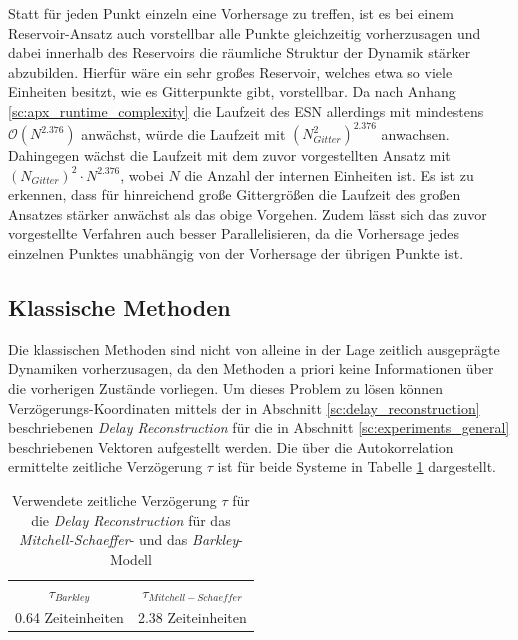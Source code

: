 Statt für jeden Punkt einzeln eine Vorhersage zu treffen, ist es bei einem Reservoir-Ansatz auch vorstellbar alle Punkte gleichzeitig vorherzusagen und dabei innerhalb des Reservoirs die räumliche Struktur der Dynamik stärker abzubilden. Hierfür wäre ein sehr großes Reservoir, welches etwa so viele Einheiten besitzt, wie es Gitterpunkte gibt, vorstellbar. Da nach Anhang \ref{sc:apx_runtime_complexity} die Laufzeit des \textsc{ESN} allerdings mit mindestens $\mathcal{O}(N^{2.376})$ anwächst, würde die Laufzeit mit $(N_{Gitter}^2)^{2.376}$ anwachsen. Dahingegen wächst die Laufzeit mit dem zuvor vorgestellten Ansatz mit $(N_{Gitter})^2 \cdot N^{2.376}$, wobei $N$ die Anzahl der internen Einheiten ist. Es ist zu erkennen, dass für hinreichend große Gittergrößen die Laufzeit des großen Ansatzes stärker anwächst als das obige Vorgehen. Zudem lässt sich das zuvor vorgestellte Verfahren auch besser Parallelisieren, da die Vorhersage jedes einzelnen Punktes unabhängig von der Vorhersage der übrigen Punkte ist.   

\FloatBarrier
\subsection{Klassische Methoden}
Die klassischen Methoden sind nicht von alleine in der Lage zeitlich ausgeprägte Dynamiken vorherzusagen, da den Methoden a priori keine Informationen über die vorherigen Zustände vorliegen. Um dieses Problem zu lösen können Verzögerungs-Koordinaten mittels der in Abschnitt \ref{sc:delay_reconstruction} beschriebenen \textit{Delay Reconstruction} für die in Abschnitt \ref{sc:experiments_general} beschriebenen Vektoren aufgestellt werden. Die über die Autokorrelation ermittelte zeitliche Verzögerung $\tau$ ist für beide Systeme in Tabelle \ref{tab:delay_reconstruction_tau} dargestellt.     

\begin{table}[h]
\centering
\begin{tabular}{cc}
\hline
$\tau_{Barkley}$ & $\tau_{Mitchell-Schaeffer}$ \\ 
0.64 Zeiteinheiten & 2.38 Zeiteinheiten\\ 
\hline 
\end{tabular} 
\caption{Verwendete zeitliche Verzögerung $\tau$ für die \textit{Delay Reconstruction} für das \textit{Mitchell-Schaeffer}- und das \textit{Barkley}-Modell}
\label{tab:delay_reconstruction_tau}
\end{table} 



